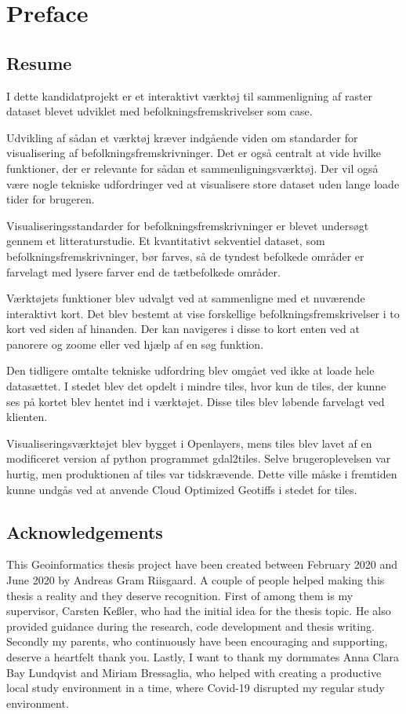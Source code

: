 \chapter{Preface} 

\section{Resume}

I dette kandidatprojekt er et interaktivt værktøj til sammenligning af raster dataset blevet udviklet med befolkningsfremskrivelser som case. 

Udvikling af sådan et værktøj kræver indgående viden om standarder for visualisering af befolkningsfremskrivninger. Det er også centralt at vide hvilke funktioner, der er relevante for sådan et sammenligningsværktøj. Der vil også være nogle tekniske udfordringer ved at visualisere store dataset uden lange loade tider for brugeren.

Visualiseringsstandarder for befolkningsfremskrivninger er blevet undersøgt gennem et litteraturstudie. Et kvantitativt sekventiel dataset, som befolkningsfremskrivninger, bør farves, så de tyndest befolkede områder er farvelagt med lysere farver end de tætbefolkede områder.

Værktøjets funktioner blev udvalgt ved at sammenligne med et nuværende interaktivt kort. Det blev bestemt at vise forskellige befolkningsfremskrivelser i to kort ved siden af hinanden. Der kan navigeres i disse to kort enten ved at panorere og zoome eller ved hjælp af en søg funktion. 

Den tidligere omtalte tekniske udfordring blev omgået ved ikke at loade hele datasættet. I stedet blev det opdelt i mindre tiles, hvor kun de tiles, der kunne ses på kortet blev hentet ind i værktøjet. Disse tiles blev løbende farvelagt ved klienten.

Visualiseringsværktøjet blev bygget i Openlayers, mens tiles blev lavet af en modificeret version af python programmet gdal2tiles. Selve brugeroplevelsen var hurtig, men produktionen af tiles var tidskrævende. 
Dette ville måske i fremtiden kunne undgås ved at anvende Cloud Optimized Geotiffs i stedet for tiles.


\section{Acknowledgements}
This Geoinformatics thesis project have been created between February 2020 and June 2020 by Andreas Gram Riisgaard. 
A couple of people helped making this thesis a reality and they deserve recognition.
First of among them is my supervisor, Carsten Ke{\ss}ler, who had the initial idea for the thesis topic. He also provided guidance during the research, code development and thesis writing.
Secondly my parents, who continuously have been encouraging and supporting, deserve a heartfelt thank you. 
Lastly, I want to thank my dormmates Anna Clara Bay Lundqvist and Miriam Bressaglia, who helped with creating a productive local study environment in a time, where Covid-19 disrupted my regular study environment.

